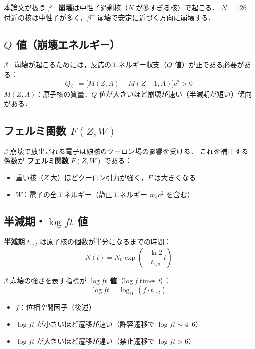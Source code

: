 \documentclass[12pt,a4paper]{ltjsarticle}
\begin{document}
\begin{point}
本論文が扱う \textbf{$\beta^-$ 崩壊}は中性子過剰核（$N$ が多すぎる核）で起こる．
$N=126$ 付近の核は中性子が多く，$\beta^-$ 崩壊で安定に近づく方向に崩壊する．
\end{point}

\subsection{$Q$ 値（崩壊エネルギー）}

$\beta^-$ 崩壊が起こるためには，反応のエネルギー収支（$Q$ 値）が正である必要がある：
\begin{equation}
  Q_{\beta^-} = \bigl[M(Z, A) - M(Z+1, A)\bigr] c^2 > 0
\end{equation}
$M(Z, A)$：原子核の質量．$Q$ 値が大きいほど崩壊が速い（半減期が短い）傾向がある．

\subsection{フェルミ関数 $F(Z, W)$}

$\beta$ 崩壊で放出される電子は娘核のクーロン場の影響を受ける．
これを補正する係数が \textbf{フェルミ関数} $F(Z, W)$ である：
\begin{itemize}
  \item 重い核（$Z$ 大）ほどクーロン引力が強く，$F$ は大きくなる
  \item $W$：電子の全エネルギー（静止エネルギー $m_e c^2$ を含む）
\end{itemize}

\subsection{半減期・$\log ft$ 値}

\textbf{半減期} $t_{1/2}$ は原子核の個数が半分になるまでの時間：
\begin{equation}
  N(t) = N_0 \exp\!\left(-\frac{\ln 2}{t_{1/2}}\,t\right)
\end{equation}

$\beta$ 崩壊の強さを表す指標が \textbf{$\log ft$ 値}（log \textit{f} times \textit{t}）：
\begin{equation}
  \log ft = \log_{10}(f \cdot t_{1/2})
\end{equation}
\begin{itemize}
  \item $f$：位相空間因子（後述）
  \item $\log ft$ が小さいほど遷移が速い（許容遷移で $\log ft \sim 4$--$6$）
  \item $\log ft$ が大きいほど遷移が遅い（禁止遷移で $\log ft > 6$）
\end{itemize}
\end{document}
